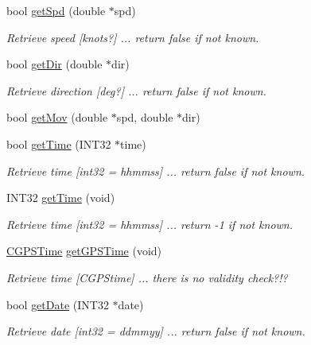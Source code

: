 \begin{DoxyCompactItemize}
\item 
bool \hyperlink{classCGPSData_acd8a7993ac32bae593f6a7400e6925bb}{getSpd} (double $\ast$spd)
\begin{DoxyCompactList}\small\item\em Retrieve speed \mbox{[}knots?\mbox{]} ... return false if not known. \item\end{DoxyCompactList}\item 
bool \hyperlink{classCGPSData_ab5f59cc73a1f6212b7ce1b6e77879255}{getDir} (double $\ast$dir)
\begin{DoxyCompactList}\small\item\em Retrieve direction \mbox{[}deg?\mbox{]} ... return false if not known. \item\end{DoxyCompactList}\item 
bool \hyperlink{classCGPSData_aff898f5b25991b59c883848b6c0441fd}{getMov} (double $\ast$spd, double $\ast$dir)
\item 
bool \hyperlink{classCGPSData_a711acc6ad968a80cfc568955c1f3c064}{getTime} (INT32 $\ast$time)
\begin{DoxyCompactList}\small\item\em Retrieve time \mbox{[}int32 = hhmmss\mbox{]} ... return false if not known. \item\end{DoxyCompactList}\item 
INT32 \hyperlink{classCGPSData_a0d2ebcc1079953780d10f7cbff48b1fc}{getTime} (void)
\begin{DoxyCompactList}\small\item\em Retrieve time \mbox{[}int32 = hhmmss\mbox{]} ... return -\/1 if not known. \item\end{DoxyCompactList}\item 
\hyperlink{classCGPSTime}{CGPSTime} \hyperlink{classCGPSData_a2441f1d3ec9dc0fe91a1cafdcbc68cdf}{getGPSTime} (void)
\begin{DoxyCompactList}\small\item\em Retrieve time \mbox{[}CGPStime\mbox{]} ... there is no validity check?!? \item\end{DoxyCompactList}\item 
bool \hyperlink{classCGPSData_ad3c9264233a0e6ab8fe5b155ccacf0a5}{getDate} (INT32 $\ast$date)
\begin{DoxyCompactList}\small\item\em Retrieve date \mbox{[}int32 = ddmmyy\mbox{]} ... return false if not known. \item\end{DoxyCompactList}\item 

\end{DoxyCompactItemize}
